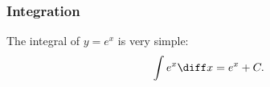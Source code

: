 \begin{frame}
\frametitle{Integration}
The integral of $y = e^x$ is very simple:
\[
\int e^x \diff x = e^x + C .
\]
\end{frame}
